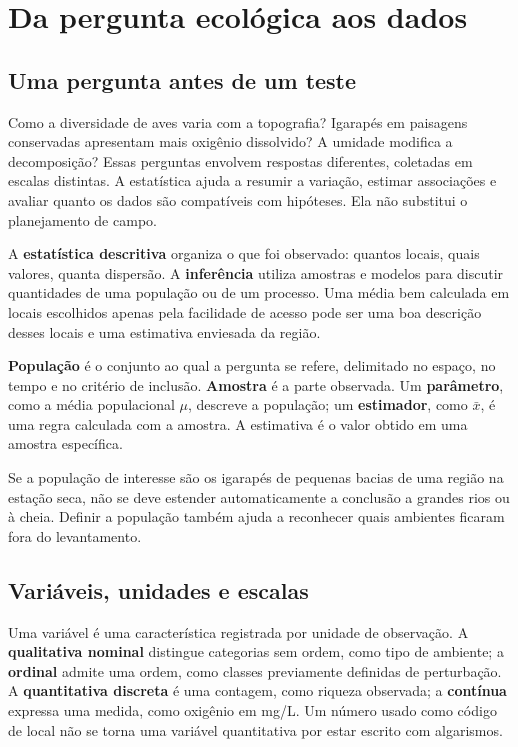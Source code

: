 \chapter{Da pergunta ecológica aos dados}

\section{Uma pergunta antes de um teste}
Como a diversidade de aves varia com a topografia? Igarapés em paisagens conservadas apresentam mais oxigênio dissolvido? A umidade modifica a decomposição? Essas perguntas envolvem respostas diferentes, coletadas em escalas distintas. A estatística ajuda a resumir a variação, estimar associações e avaliar quanto os dados são compatíveis com hipóteses. Ela não substitui o planejamento de campo.

A \textbf{estatística descritiva} organiza o que foi observado: quantos locais, quais valores, quanta dispersão. A \textbf{inferência} utiliza amostras e modelos para discutir quantidades de uma população ou de um processo. Uma média bem calculada em locais escolhidos apenas pela facilidade de acesso pode ser uma boa descrição desses locais e uma estimativa enviesada da região.

\begin{conceito}
\textbf{População} é o conjunto ao qual a pergunta se refere, delimitado no espaço, no tempo e no critério de inclusão. \textbf{Amostra} é a parte observada. Um \textbf{parâmetro}, como a média populacional $\mu$, descreve a população; um \textbf{estimador}, como $\bar{x}$, é uma regra calculada com a amostra. A estimativa é o valor obtido em uma amostra específica.
\end{conceito}

Se a população de interesse são os igarapés de pequenas bacias de uma região na estação seca, não se deve estender automaticamente a conclusão a grandes rios ou à cheia. Definir a população também ajuda a reconhecer quais ambientes ficaram fora do levantamento.

\section{Variáveis, unidades e escalas}
Uma variável é uma característica registrada por unidade de observação. A \textbf{qualitativa nominal} distingue categorias sem ordem, como tipo de ambiente; a \textbf{ordinal} admite uma ordem, como classes previamente definidas de perturbação. A \textbf{quantitativa discreta} é uma contagem, como riqueza observada; a \textbf{contínua} expressa uma medida, como oxigênio em mg/L. Um número usado como código de local não se torna uma variável quantitativa por estar escrito com algarismos.

